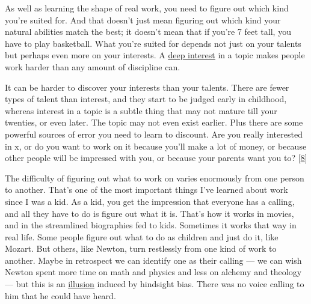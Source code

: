 As well as learning the
                  shape of real work, you need to figure out which kind you're
                  suited for. And that doesn't just mean figuring out which kind
                  your natural abilities match the best; it doesn't mean that if
                  you're 7 feet tall, you have to play basketball. What you're
                  suited for depends not just on your talents but perhaps even
                  more on your interests. A
                  \href{http://www.paulgraham.com/genius.html}{\underline{deep interest}} in a topic
                  makes people work harder than any amount of discipline can.

It
                  can be harder to discover your interests than your talents.
                  There are fewer types of talent than interest, and they start
                  to be judged early in childhood, whereas interest in a topic
                  is a subtle thing that may not mature till your twenties, or
                  even later. The topic may not even exist earlier. Plus there
                  are some powerful sources of error you need to learn to
                  discount. Are you really interested in x, or do you want to
                  work on it because you'll make a lot of money, or because
                  other people will be impressed with you, or because your
                  parents want you to?
                  [\href{\#f8n}{8}]

The difficulty of figuring out what to work on
                  varies enormously from one person to another. That's one of
                  the most important things I've learned about work since I was
                  a kid. As a kid, you get the impression that everyone has a
                  calling, and all they have to do is figure out what it is.
                  That's how it works in movies, and in the streamlined
                  biographies fed to kids. Sometimes it works that way in real
                  life. Some people figure out what to do as children and just
                  do it, like Mozart. But others, like Newton, turn restlessly
                  from one kind of work to another. Maybe in retrospect we can
                  identify one as their calling --- we can wish Newton spent
                  more time on math and physics and less on alchemy and theology
                  --- but this is an
                  \href{http://www.paulgraham.com/disc.html}{\underline{illusion}} induced by hindsight
                  bias. There was no voice calling to him that he could have
                  heard.

